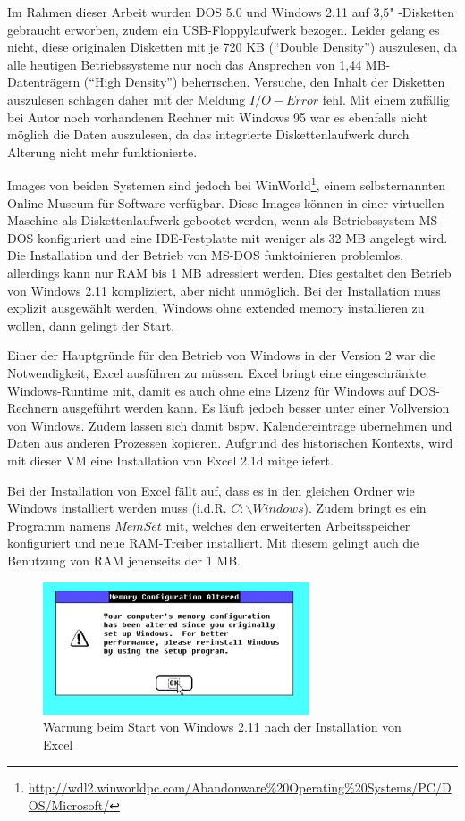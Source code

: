 	Im Rahmen dieser Arbeit wurden DOS 5.0 und Windows 2.11 auf 3,5" -Disketten gebraucht erworben, zudem ein USB-Floppylaufwerk bezogen.
	Leider gelang es nicht, diese originalen Disketten mit je 720 KB ("`Double Density"') auszulesen, da alle heutigen Betriebssysteme nur noch das Ansprechen von 1,44 MB-Datenträgern ("`High Density"') beherrschen.
	Versuche, den Inhalt der Disketten auszulesen schlagen daher mit der Meldung $I/O-Error$ fehl.
	Mit einem zufällig bei Autor noch vorhandenen Rechner mit Windows 95 war es ebenfalls nicht möglich die Daten auszulesen, da das integrierte Diskettenlaufwerk durch Alterung nicht mehr funktionierte.

	Images von beiden Systemen sind jedoch bei WinWorld\footnote{\url{http://wdl2.winworldpc.com/Abandonware\%20Operating\%20Systems/PC/DOS/Microsoft/}}, einem selbsternannten Online-Museum für Software verfügbar.
	Diese Images können in einer virtuellen Maschine als Diskettenlaufwerk gebootet werden, wenn als Betriebssystem MS-DOS konfiguriert und eine IDE-Festplatte mit weniger als 32 MB angelegt wird.
	Die Installation und der Betrieb von MS-DOS funktoinieren problemlos, allerdings kann nur RAM bis 1 MB adressiert werden.
	Dies gestaltet den Betrieb von Windows 2.11 kompliziert, aber nicht unmöglich.
	Bei der Installation muss explizit ausgewählt werden, Windows ohne extended memory installieren zu wollen, dann gelingt der Start.

	Einer der Hauptgründe für den Betrieb von Windows in der Version 2 war die Notwendigkeit, Excel ausführen zu müssen.
	Excel bringt eine eingeschränkte Windows-Runtime mit, damit es auch ohne eine Lizenz für Windows auf DOS-Rechnern ausgeführt werden kann.
	Es läuft jedoch besser unter einer Vollversion von Windows. 
	Zudem lassen sich damit bspw. Kalendereinträge übernehmen und Daten aus anderen Prozessen  kopieren.
	Aufgrund des historischen Kontexts, wird mit dieser VM eine Installation von Excel 2.1d mitgeliefert.

	Bei der Installation von Excel fällt auf, dass es in den gleichen Ordner wie Windows installiert werden muss (i.d.R. $C:\backslash{}Windows$). Zudem bringt es ein Programm namens $MemSet$ mit, welches den erweiterten Arbeitsspeicher konfiguriert und neue RAM-Treiber installiert. Mit diesem gelingt auch die Benutzung von RAM jenenseits der 1 MB.



	\begin{figure}[p]
		\begin{center}
			\includegraphics[width=0.7\textwidth]{img/WIN211_1}
			\caption{Warnung beim Start von Windows 2.11 nach der Installation von Excel}
			\label{fig:screenshot-win211error}
		\end{center}
	\end{figure}

